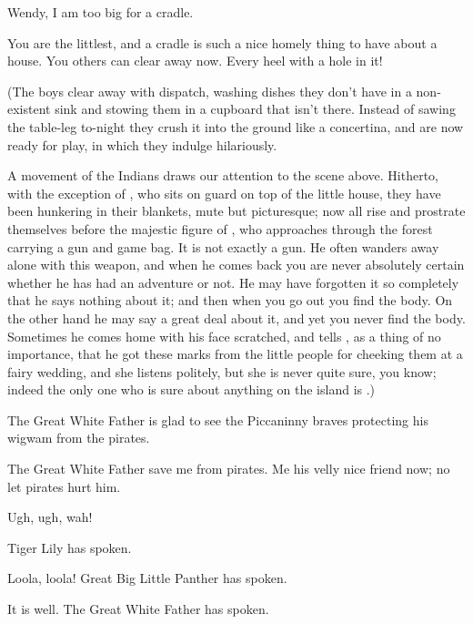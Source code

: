 \begin{drama}
\michaelspeaks
Wendy, I am too big for a cradle.

\wendyspeaks
You are the littlest, and a cradle is such a nice homely thing to have about a house.
You others can clear away now.
Every heel with a hole in it!

\begin{stagedir}
(The boys clear away with dispatch,
washing dishes they don’t have in a non-existent sink and stowing them in a cupboard that isn’t there.
Instead of sawing the table-leg to-night they crush it into the ground like a concertina,
and are now ready for play, in which they indulge hilariously.

A movement of the Indians draws our attention to the scene above.
Hitherto, with the exception of \panther, who sits on guard on top of the little house,
they have been hunkering in their blankets, mute but picturesque;
now all rise and prostrate themselves before the majestic figure of \peter,
who approaches through the forest carrying a gun and game bag.
It is not exactly a gun.
He often wanders away alone with this weapon,
and when he comes back you are never absolutely certain whether he has had an adventure or not.
He may have forgotten it so completely that he says nothing about it;
and then when you go out you find the body.
On the other hand he may say a great deal about it, and yet you never find the body.
Sometimes he comes home with his face scratched,
and tells \wendy, as a thing of no importance,
that he got these marks from the little people for cheeking them at a fairy wedding,
and she listens politely, but she is never quite sure, you know;
indeed the only one who is sure about anything on the island is \peter.)
\end{stagedir}

\peterspeaks
The Great White Father is glad to see the Piccaninny braves protecting his wigwam from the pirates.

\tigerlilyspeaks
The Great White Father save me from pirates.
Me his velly nice friend now;
no let pirates hurt him.

Ugh, ugh, wah!

\tigerlilyspeaks
Tiger Lily has spoken.

\pantherspeaks
Loola, loola!
Great Big Little Panther has spoken.

\peterspeaks
It is well.
The Great White Father has spoken.



\end{drama}
